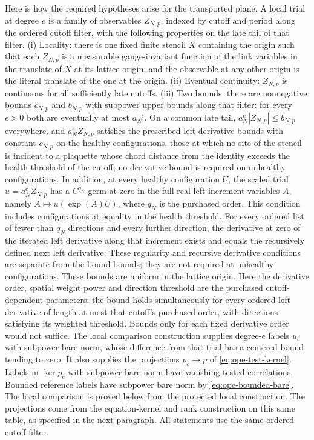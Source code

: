 Here is how the required hypotheses arise for the transported plane.
A local trial at degree
$e$ is a family of observables $Z_{N,p}$, indexed by cutoff and period along the ordered
cutoff filter, with the following properties on the late tail of that filter.
(i) Locality: there is one fixed finite stencil $X$ containing the origin such that each $Z_{N,p}$
is a measurable gauge-invariant function of the link variables in the
translate of $X$ at its lattice origin, and the observable at any other
origin is the literal translate of the one at the origin. (ii) Eventual
continuity: $Z_{N,p}$ is continuous for all sufficiently late cutoffs.
(iii) Two bounds: there are nonnegative bounds $c_{N,p}$ and $b_{N,p}$ with subpower
upper bounds along that filter: for every $\epsilon>0$ both are eventually
at most $a_N^{-\epsilon}$. On a common late tail,
$a_N^e|Z_{N,p}|\le b_{N,p}$ everywhere, and
$a_N^eZ_{N,p}$ satisfies the prescribed left-derivative bounds with constant
$c_{N,p}$ on the healthy configurations, those at which no site of the
stencil is incident to a plaquette whose chord distance from the identity
exceeds the health threshold of the cutoff; no derivative
bound is required on unhealthy configurations. In addition, at every healthy
configuration $U$, the scaled trial $u=a_N^eZ_{N,p}$ has a $C^{q_N}$ germ at
zero in the full real left-increment variables $A$, namely
$A\mapsto u(\exp(A)U)$, where $q_N$ is the purchased order. This condition
includes configurations at equality in the health threshold. For every
ordered list of fewer than $q_N$ directions and every further direction,
the derivative at zero of the iterated left derivative along that increment
exists and equals the recursively defined next left derivative. These
regularity and recursive derivative conditions are separate from the bound
bounds; they are not required at unhealthy configurations. These bounds are
uniform in the lattice origin. Here the derivative
order, spatial weight power and direction threshold are the purchased
cutoff-dependent parameters: the bound holds simultaneously for every
ordered left derivative of length at most that cutoff's purchased order,
with directions satisfying its weighted threshold. Bounds only for each
fixed derivative order would not suffice. The local comparison
construction supplies degree-$e$ labels $u_c$ with subpower bare norm,
whose difference from that trial has a centered bound tending to zero.
It also supplies the projections $p_c\to p$ of
\eqref{eq:ope-test-kernel}. Labels in $\ker p_c$ with subpower bare norm
have vanishing tested correlations. Bounded reference labels have
subpower bare norm by \eqref{eq:ope-bounded-bare}. The local comparison is proved below from the protected local
construction. The projections come from the equation-kernel and rank
construction on this same table, as specified in the next paragraph.
All statements use the same ordered cutoff filter.


